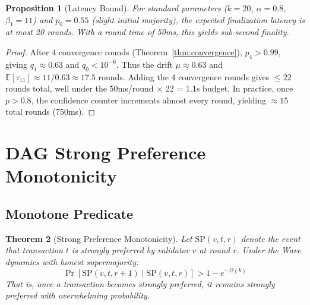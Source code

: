 \documentclass[11pt,a4paper]{article}
\newtheorem{theorem}{Theorem}[section]
\newtheorem{proposition}[theorem]{Proposition}
\begin{document}
\begin{proposition}[Latency Bound]
\label{prop:latency}
For standard parameters ($k = 20$, $\alpha = 0.8$, $\beta_1 = 11$) and $p_0 = 0.55$
(slight initial majority), the expected finalization latency is at most 20 rounds.
With a round time of 50ms, this yields sub-second finality.
\end{proposition}

\begin{proof}
After 4 convergence rounds (Theorem~\ref{thm:convergence}), $p_4 > 0.99$, giving
$q_1 \approx 0.63$ and $q_0 < 10^{-6}$. Thus the drift $\mu \approx 0.63$ and
$\mathbb{E}[\tau_{11}] \approx 11/0.63 \approx 17.5$ rounds. Adding the 4 convergence
rounds gives $\leq 22$ rounds total, well under the 50ms/round $\times$ 22 = 1.1s budget.
In practice, once $p > 0.8$, the confidence counter increments almost every round,
yielding $\approx 15$ total rounds (750ms).
\end{proof}

\section{DAG Strong Preference Monotonicity}
\label{sec:dag}

\subsection{Monotone Predicate}

\begin{theorem}[Strong Preference Monotonicity]
\label{thm:dag-monotone}
Let $\text{SP}(v, t, r)$ denote the event that transaction $t$ is strongly preferred
by validator $v$ at round $r$. Under the Wave dynamics with honest supermajority:
\[
\Pr[\text{SP}(v, t, r+1) \mid \text{SP}(v, t, r)] > 1 - e^{-\Omega(k)}
\]
That is, once a transaction becomes strongly preferred, it remains strongly preferred
with overwhelming probability.
\end{theorem}
\end{document}
